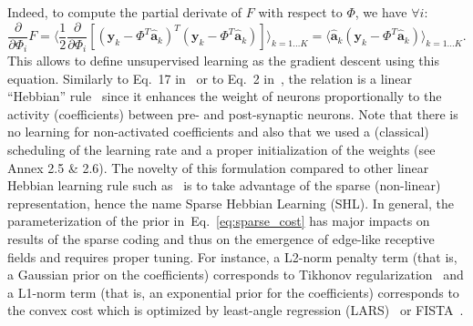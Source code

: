 \documentclass[draft]{article} %
\newcommand{\coef}{\mathbf{a}} %
\newcommand{\image}{\mathbf{y}} %
\newcommand{\dico}{\Phi} %
\newcommand{\seeEq}[1]{Eq.~\ref{eq:#1}}%
\begin{document}
Indeed, to compute the partial derivate of $F$ with respect to $\dico$, we have $\forall i$:
\begin{equation} \frac{\partial }{\partial \dico_i } F = \langle\frac{1}{2} \frac{\partial }{\partial \dico_i }[(\image_k - \dico^T \hat{\coef}_{k})^T (\image_k - \dico^T \hat{\coef}_{k})]\rangle_{k = 1 \ldots K} = \langle\hat{\coef}_{k} (\image_k - \dico^T \hat{\coef}_{k})\rangle_{k = 1 \ldots K}.\end{equation}
This allows to define unsupervised learning as the gradient descent using this equation. Similarly to Eq.~17 in~\citep{Olshausen97} or to Eq.~2 in~\citep{Smith06}, the relation is a linear ``Hebbian'' rule~\citep{Hebb49} since it enhances the weight of neurons proportionally to the activity (coefficients) between pre- and post-synaptic neurons. Note that there is no learning for non-activated coefficients and also that we used a (classical) scheduling of the learning rate and a proper initialization of the weights (see Annex 2.5 \& 2.6). The novelty of this formulation compared to other linear Hebbian learning rule such as~\citep{Oja82} is to take advantage of the sparse (non-linear) representation, hence the name Sparse Hebbian Learning (SHL).
In general, the parameterization of the prior in~\seeEq{sparse_cost} has major impacts on results of the sparse coding and thus on the emergence of edge-like receptive fields and requires proper tuning. For instance, a L2-norm penalty term (that is, a Gaussian prior on the coefficients) corresponds to Tikhonov regularization~\citep{Tikhonov77} and a L1-norm term (that is, an exponential prior for the coefficients) corresponds to the convex cost which is optimized by least-angle regression (LARS)~\citep{efron2004least} or FISTA~\citep{beck2009fast}. %
\end{document}
